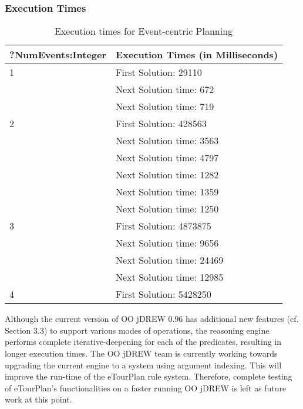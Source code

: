 \subsubsection{Execution Times}    

\begin{table} [tbph]
\caption{Execution times for Event-centric Planning}
\centering
\footnotesize
\begin{tabular}{|l|l|}
\hline
  ?NumEvents:Integer & Execution Times (in Milliseconds)\\
\hline
  1& First Solution: 29110\\
   &Next Solution time: 672\\
   &Next Solution time: 719\\
 \hline
  2   & First Solution: 428563 \\
      &Next Solution time: 3563\\
      &Next Solution time: 4797\\
       &Next Solution time: 1282\\
        &Next Solution time: 1359\\
         &Next Solution time: 1250\\
\hline
  3 & First Solution:  4873875\\
     &Next Solution time: 9656\\
     &Next Solution time: 24469\\
     &Next Solution time: 12985\\
\hline
  4 & First Solution:  5428250\\
\hline
\end{tabular} 
\end{table}  

\hspace{0.3in} Although the current version of OO jDREW 0.96 has additional new features (cf. Section 3.3) to support various modes of operations, the reasoning engine performs complete iterative-deepening for each of the predicates, resulting in longer execution times. The OO jDREW team is currently working towards upgrading the current engine to
a system using argument indexing. This will improve the run-time of the eTourPlan rule system. Therefore, complete testing of eTourPlan's functionalities on a faster running OO jDREW is left as future work at this point. 